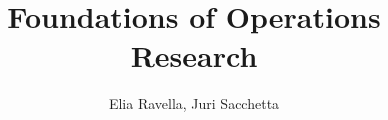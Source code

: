 \documentclass[a4paper]{book}
\begin{document}
	\author{Elia Ravella, Juri Sacchetta}
	\title{Foundations of Operations Research}
	\maketitle
	\tableofcontents
	
	
\end{document}
